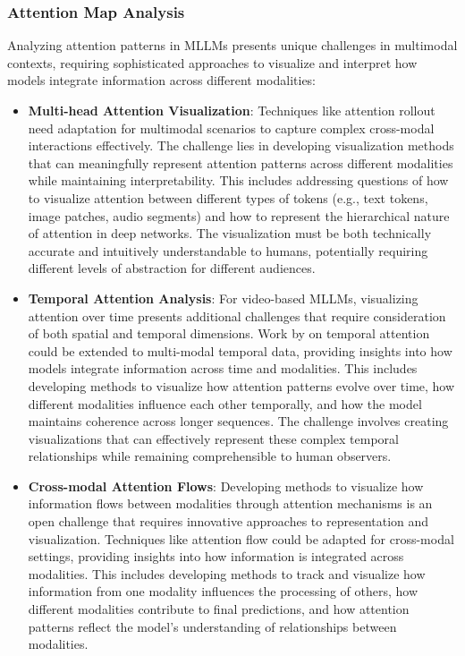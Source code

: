 \subsubsection{Attention Map Analysis}
Analyzing attention patterns in MLLMs presents unique challenges in multimodal contexts, requiring sophisticated approaches to visualize and interpret how models integrate information across different modalities:

\begin{itemize}
    \item \textbf{Multi-head Attention Visualization}: Techniques like attention rollout \citep{abnar2020quantifying} need adaptation for multimodal scenarios to capture complex cross-modal interactions effectively. The challenge lies in developing visualization methods that can meaningfully represent attention patterns across different modalities while maintaining interpretability. This includes addressing questions of how to visualize attention between different types of tokens (e.g., text tokens, image patches, audio segments) and how to represent the hierarchical nature of attention in deep networks. The visualization must be both technically accurate and intuitively understandable to humans, potentially requiring different levels of abstraction for different audiences.
    
    \item \textbf{Temporal Attention Analysis}: For video-based MLLMs, visualizing attention over time presents additional challenges that require consideration of both spatial and temporal dimensions. Work by on temporal attention could be extended to multi-modal temporal data, providing insights into how models integrate information across time and modalities. This includes developing methods to visualize how attention patterns evolve over time, how different modalities influence each other temporally, and how the model maintains coherence across longer sequences. The challenge involves creating visualizations that can effectively represent these complex temporal relationships while remaining comprehensible to human observers.
    
    \item \textbf{Cross-modal Attention Flows}: Developing methods to visualize how information flows between modalities through attention mechanisms is an open challenge that requires innovative approaches to representation and visualization. Techniques like attention flow \citep{abnar2020quantifying} could be adapted for cross-modal settings, providing insights into how information is integrated across modalities. This includes developing methods to track and visualize how information from one modality influences the processing of others, how different modalities contribute to final predictions, and how attention patterns reflect the model's understanding of relationships between modalities.
\end{itemize}

